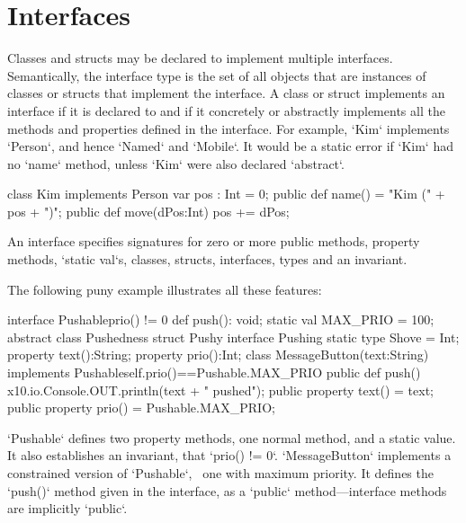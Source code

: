 \chapter{Interfaces}



Classes and structs may be declared to implement multiple interfaces. Semantically, the
interface type is the set of all objects that are instances of classes
or structs that
implement the interface. A class or struct implements an interface if it is declared to
and if it concretely or abstractly implements all the methods and properties
defined in the interface. For example, \xcd`Kim` implements
\xcd`Person`, and hence \xcd`Named` and \xcd`Mobile`. It would be a static
error if \xcd`Kim` had no \xcd`name` method, unless \xcd`Kim` were also
declared \xcd`abstract`.

\begin{xten}
class Kim implements Person {
   var pos : Int = 0;
   public def name() = "Kim (" + pos + ")";
   public def move(dPos:Int) { pos += dPos; }
}
\end{xten}
%


\label{XtenInterfaces}

An interface specifies signatures for zero or more public methods, property
methods,
\xcd`static val`s, 
classes, structs, interfaces, types
and an invariant. 

The following puny example illustrates all these features: 
% 
\begin{xten}
interface Pushable{prio() != 0} {
  def push(): void;
  static val MAX_PRIO = 100;
  abstract class Pushedness{}
  struct Pushy{}
  interface Pushing{}
  static type Shove = Int;
  property text():String;
  property prio():Int;
}
class MessageButton(text:String)
  implements Pushable{self.prio()==Pushable.MAX_PRIO} {
  public def push() { 
    x10.io.Console.OUT.println(text + " pushed");
  }
  public property text() = text;
  public property prio() = Pushable.MAX_PRIO;
}
\end{xten}
%
\noindent
\xcd`Pushable` defines two property methods, one normal method, and a static
value.  It also 
establishes an invariant, that \xcd`prio() != 0`. 
\xcd`MessageButton` implements a constrained version of \xcd`Pushable`,
\viz\ one with maximum priority.  It
defines the \xcd`push()` method given in the interface, as a \xcd`public`
method---interface methods are implicitly \xcd`public`.

